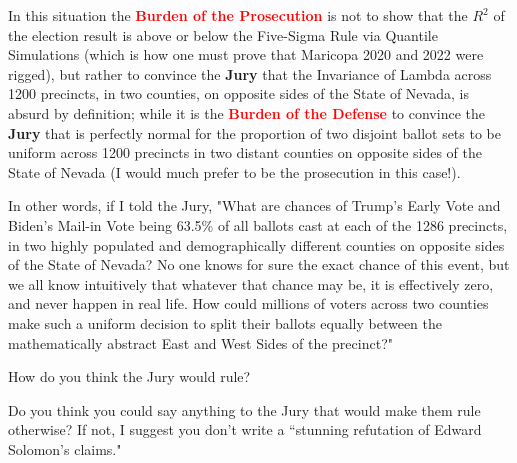 In this situation the \textbf{\textcolor{red}{Burden of the Prosecution}} is not to show that the $R^2$ of the election result is above or below the Five-Sigma Rule via Quantile Simulations (which is how one must prove that Maricopa 2020 and 2022 were rigged), but rather to convince the \textbf{Jury} that the Invariance of Lambda across 1200 precincts, in two counties, on opposite sides of the State of Nevada, is absurd by definition; while it is the \textbf{\textcolor{red}{Burden of the Defense}} to convince the \textbf{Jury} that is perfectly normal for the proportion of two disjoint ballot sets to be uniform across 1200 precincts in two distant counties on opposite sides of the State of Nevada (I would much prefer to be the prosecution in this case!).

In other words, if I told the Jury, "What are chances of Trump's Early Vote and Biden's Mail-in Vote being 63.5\% of all ballots cast at each of the 1286 precincts, in two highly populated and demographically different counties on opposite sides of the State of Nevada? No one knows for sure the exact chance of this event, but we all know intuitively that whatever that chance may be, it is effectively zero, and never happen in real life. How could millions of voters across two counties make such a uniform decision to split their ballots equally between the mathematically abstract East and West Sides of the precinct?" 

How do you think the Jury would rule?

Do you think you could say anything to the Jury that would make them rule otherwise? If not, I suggest you don't write a ``stunning refutation of Edward Solomon's claims."
\newpage
